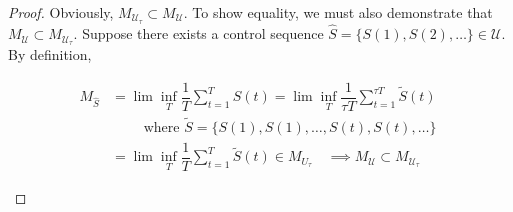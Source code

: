 \begin{proof}
Obviously, $M_{\mathcal U_\tau}  \subset M_{\mathcal U}$. To show equality, we must also demonstrate that $M_{\mathcal U}  \subset M_{\mathcal {U}_\tau} $. Suppose there exists a control sequence $\hat{S} = \{ S(1), S(2), \ldots \} \in \mathcal{U}$. 
By definition, \begin{small}
\begin{align*}
M_{\hat{S}} &= \lim\inf_{T} \dfrac{1}{T}\sum_{t=1}^{T} S(t) = \lim\inf_{T} \dfrac{1}{\tau T}\sum_{t=1}^{\tau T}  \tilde{S}(t) \; \\ 
& \qquad \text{ where } \tilde{S} = \{S(1), S(1), \ldots, S(t), S(t), \ldots \} \\
&= \lim\inf_{T} \dfrac{1}{ T}\sum_{t=1}^{T}  \tilde{S}(t) \in M_{U_\tau}  \quad \implies M_{\mathcal U}  \subset M_{\mathcal {U}_\tau}
\end{align*}\end{small}
\end{proof}
